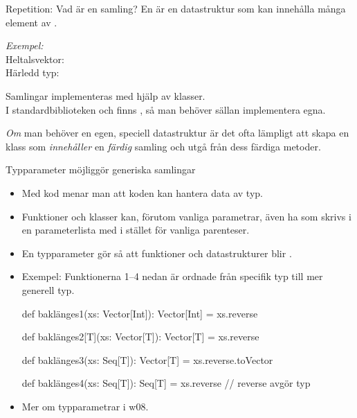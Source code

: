 


\begin{Slide}{Repetition: Vad är en samling?}
En   är en datastruktur som kan innehålla många element av .

\pause
\vspace{2em}\emph{Exempel:} \\Heltalsvektor: \hfill{}\\
\pause
Härledd typ: \hfill{}


\pause
{\SlideFontSmall\vspace{2em}Samlingar implementeras med hjälp av klasser. \\ I standardbiblioteken  och  finns  , så man behöver sällan implementera egna.

\pause\vspace{0.5em}\emph{Om} man behöver en egen, speciell datastruktur är det ofta lämpligt att skapa en klass som \emph{innehåller} en \emph{färdig} samling och utgå från dess färdiga metoder.

}

\end{Slide}





\begin{Slide}{Typparameter möjliggör generiska samlingar}\SlideFontSmall

\begin{itemize}
  \item Med   kod menar man att koden kan hantera data av  typ.
  \item Funktioner och klasser kan, förutom vanliga parametrar, även ha  som skrivs i en  parameterlista med  i stället för vanliga parenteser.

  \item En typparameter gör så att funktioner och datastrukturer blir .

  \item Exempel: Funktionerna  1--4 nedan är ordnade från specifik typ till mer generell typ.

\begin{Code}
def baklänges1(xs: Vector[Int]): Vector[Int] = xs.reverse

def baklänges2[T](xs: Vector[T]): Vector[T] = xs.reverse

def baklänges3(xs: Seq[T]): Vector[T] = xs.reverse.toVector

def baklänges4(xs: Seq[T]): Seq[T] = xs.reverse  // reverse avgör typ
\end{Code}
\item Mer om typparametrar i w08.
\end{itemize}
\end{Slide}



